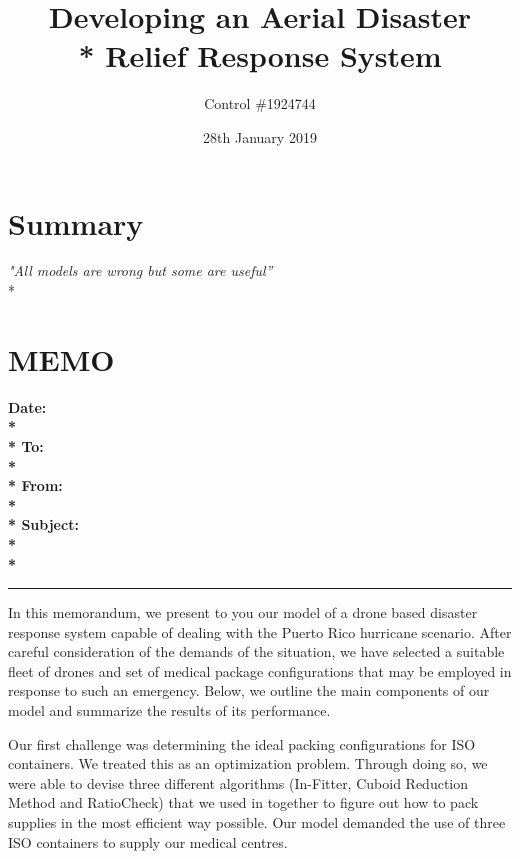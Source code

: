 \documentclass[a4paper,12pt]{article}
\begin{document}
\title{Developing an Aerial Disaster \\* Relief Response System}
\author{Control \#1924744}
\date{28th January 2019}
\maketitle
\newpage


\pagestyle{style2}

\section*{\hfil Summary\hfil}
\begin{center}
\textit{"All models are wrong but some are useful''} \\*
\end{center}

\newpage

\section*{\hfil MEMO\hfil}
\hrulefill

\bf{Date:} \\*\\*
\bf{To:} \\*\\*
\bf{From:} \\*\\*
\bf{Subject:} \\*\\*
{\color{black}\hrule}
In this memorandum, we present to you our model of a drone based disaster response system capable of dealing with the Puerto Rico hurricane scenario. After careful consideration of the demands of the situation, we have selected a suitable fleet of drones and set of medical package configurations that may be employed in response to such an emergency. Below, we outline the main components of our model and summarize the results of its performance.

Our first challenge was determining the ideal packing configurations for ISO containers. We treated this as an optimization problem. Through doing so, we were able to devise three different algorithms (In-Fitter, Cuboid Reduction Method and RatioCheck) that we used in together to figure out how to pack supplies in the most efficient way possible. Our model demanded the use of three ISO containers to supply our medical centres.
\end{document}
